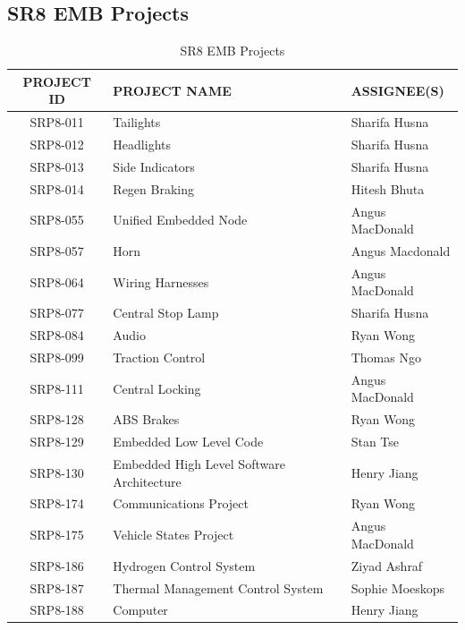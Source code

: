     \subsection{SR8 EMB Projects}
        \begin{table}[h]
            \centering
            \renewcommand{\arraystretch}{1.2}
            \begin{tabularx}{\textwidth}{|c|X|X|}
            \hline
            \textbf{PROJECT ID} & \textbf{PROJECT NAME} & \textbf{ASSIGNEE(S)} \\
            \hline
            SRP8-011 & Tailights & Sharifa Husna \\
            SRP8-012 & Headlights & Sharifa Husna \\
            SRP8-013 & Side Indicators & Sharifa Husna \\
            SRP8-014 & Regen Braking & Hitesh Bhuta \\
            SRP8-055 & Unified Embedded Node & Angus MacDonald \\
            SRP8-057 & Horn & Angus Macdonald \\
            SRP8-064 & Wiring Harnesses & Angus MacDonald \\
            SRP8-077 & Central Stop Lamp & Sharifa Husna \\
            SRP8-084 & Audio & Ryan Wong \\
            SRP8-099 & Traction Control & Thomas Ngo \\
            SRP8-111 & Central Locking & Angus MacDonald \\
            SRP8-128 & ABS Brakes & Ryan Wong \\
            SRP8-129 & Embedded Low Level Code & Stan Tse \\
            SRP8-130 & Embedded High Level Software Architecture & Henry Jiang \\
            SRP8-174 & Communications Project & Ryan Wong \\
            SRP8-175 & Vehicle States Project & Angus MacDonald \\
            SRP8-186 & Hydrogen Control System & Ziyad Ashraf \\
            SRP8-187 & Thermal Management Control System & Sophie Moeskops \\
            SRP8-188 & Computer & Henry Jiang \\
            \hline
            \end{tabularx}
            \caption{SR8 EMB Projects}
            \label{tab:emb-projects}
        \end{table}

